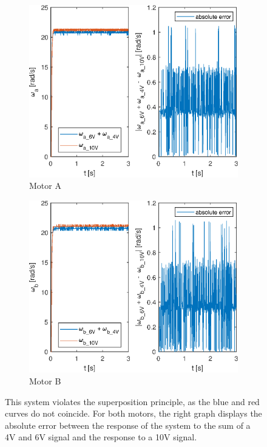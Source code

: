 \documentclass[a4paper,kul]{kulakarticle} %
\begin{document}
\begin{figure}[htp!]
	\centering
	\begin{subfigure}[b]{0.48\textwidth}
		\centering
		\includegraphics[width=\textwidth]{superposition_a.eps}
		\caption{Motor A}
	\end{subfigure}
	\hfill
	\begin{subfigure}[b]{0.48\textwidth}  
		\centering 
		\includegraphics[width=\textwidth]{superposition_b.eps}
		\caption{Motor B}
	\end{subfigure}
	\caption[Superposition principle]{This system violates the superposition principle, as the blue and red curves do not coincide. For both motors, the right graph displays the absolute error between the response of the system to the sum of a 4V and 6V signal and the response to a 10V signal.} 
	\label{fig:superposition}
\end{figure}
\end{document}
